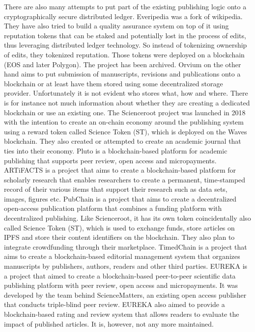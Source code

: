 There are also many attempts to put part of the existing publishing logic onto a cryptographically secure distributed ledger. Everipedia\cite{forselius_everipedia} was a fork of wikipedia. They have also tried to build a quality assurance system on top of it using reputation tokens that can be staked and potentially lost in the process of edits, thus leveraging distributed ledger technology. So instead of tokenizing ownership of edits, they tokenized reputation. Those tokens were deployed on a blockchain (EOS and later Polygon). The project has been archived. Orvium \cite{romero_orvium} on the other hand aims to put submission of manuscripts, revisions and publications onto a blockchain or at least have them stored using some decentralized storage provider. Unfortunately it is not evident who stores what, how and where. There is for instance not much information about whether they are creating a dedicated blockchain or use an existing one.
The Scienceroot project \cite{tintas_scienceroot} was launched in 2018 with the intention to create an on-chain economy around the publishing system using a reward token called Science Token (ST), which is deployed on the Waves blockchain. They also created or attempted to create an academic journal that ties into their economy. Pluto\cite{kang_pluto} is a blockchain-based platform for academic publishing that supports peer review, open access and micropayments. ARTiFACTS\cite{artifacts_team} is a project that aims to create a blockchain-based platform for scholarly research that enables researchers to create a permanent, time-stamped record of their various items that support their research such as data sets, images, figures etc. 
PubChain\cite{pubpub_team} is a project that aims to create a decentralized open-access publication platform that combines a funding platform with decentralized publishing. Like Scienceroot, it has its own token coincidentally also called Science Token (ST), which is used to exchange funds, store articles on IPFS and store their content identifiers on the blockchain. They also plan to integrate crowdfunding through their marketplace. TimedChain \cite{timedchain_team} is a project that aims to create a blockchain-based editorial management system that organizes manuscripts by publishers, authors, readers and other third parties. EUREKA \cite{schaufelbuhl2019eureka} is a project that aimed to create a blockchain-based peer-to-peer scientific data publishing platform with peer review, open access and micropayments. It was developed by the team behind ScienceMatters, an existing open access publisher that conducts triple-blind peer review. EUREKA also aimed to provide a blockchain-based rating and review system that allows readers to evaluate the impact of published articles. It is, however, not any more maintained. 
